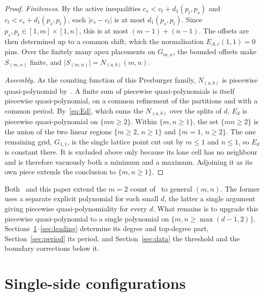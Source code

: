 \documentclass[11pt]{article}
\theoremstyle{definition}
\theoremstyle{remark}
\newcommand{\dgrid}{d_1}
\newcommand{\Gmn}{G_{m,n}}
\begin{document}
\begin{proof}
\medskip\noindent\emph{Finiteness.}
By the active inequalities $c_s<c_t+\dgrid(p_t,p_s)$ and $c_t<c_s+\dgrid(p_s,p_t)$, each $\lvert c_s-c_t\rvert$ is at most $\dgrid(p_s,p_t)$. Since $p_s,p_t\in[1,m]\times[1,n]$, this is at most $(m-1)+(n-1)$. The offsets are then determined up to a common shift, which the normalisation $E_{A,c}(1,1)=0$ pins. Over the finitely many apex placements on $\Gmn$, the bounded offsets make $S_{(m,n)}$ finite, and $\lvert S_{(m,n)}\rvert=N_{(a,b)}(m,n)$.

\medskip\noindent\emph{Assembly.}
As the counting function of this Presburger family, $N_{(a,b)}$
is piecewise quasi-polynomial by~\cite[Thm.~1.10]{Woods2015}. A finite sum of
piecewise quasi-polynomials is itself piecewise quasi-polynomial, on a common refinement of the partitions and with a
common period. By~\eqref{eq:Ed}, which sums the $N_{(a,b)}$ over the splits of $d$,
$E_d$ is piecewise quasi-polynomial on $\{mn\ge2\}$. Within $\{m,n\ge1\}$, the set $\{mn\ge2\}$
is the union of the two linear regions $\{m\ge2,\,n\ge1\}$ and
$\{m=1,\,n\ge2\}$. The one remaining grid,
$G_{1,1}$, is the single lattice point cut out by $m\le1$ and $n\le1$, so $E_d$ is
constant there. It is excluded above only because its lone cell has no
neighbour and is therefore vacuously both a minimum and a maximum.
Adjoining it as its own piece extends the conclusion to $\{m,n\ge1\}$.
\end{proof}

Both~\cite{Gupta2026companion} and this paper extend the $m=2$ count of~\cite{Christensen2025origami} to general $(m,n)$. The former uses a separate explicit polynomial for each small $d$, the latter a single argument giving piecewise quasi-polynomiality for every $d$.
What remains is to upgrade this piecewise quasi-polynomial to a single
polynomial on $\{m,n\ge\max(d-1,2)\}$. Sections~\ref{sec:onedim}--\ref{sec:leading} determine its degree and top-degree part, Section~\ref{sec:period} its period, and
Section~\ref{sec:data} the threshold and the boundary corrections below it.

\section{Single-side configurations}\label{sec:onedim}
\end{document}

